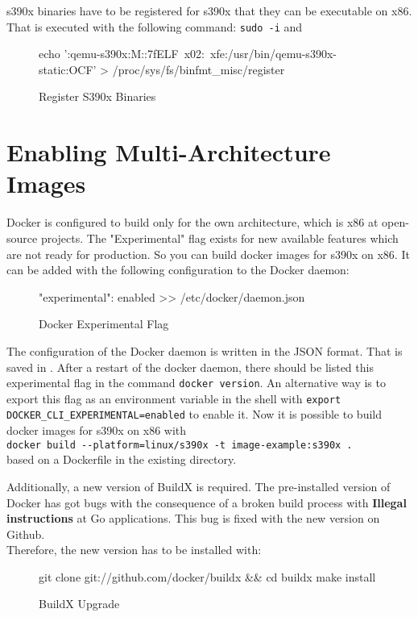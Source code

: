 s390x binaries have to be registered for s390x that they can be executable on x86. That is executed with the following command: \lstinline!sudo -i! and 
\begin{figure}[H]
\centering
\begin{boxedverbatim}
echo ':qemu-s390x:M::\x7fELF\
x02:\xff\xff\xff\xff\xff\xff\xff{}\xff\xff\xff\xff\xff\xff\xff\xff\xff\
xfe\xff\xff:/usr/bin/qemu-s390x-static:OCF' > /proc/sys/fs/binfmt_misc/register
\end{boxedverbatim}
 \caption{Register S390x Binaries}
    \label{RegisterS390xBinaries}
\end{figure}

\section{Enabling Multi-Architecture Images}\label{Multi-Architecture-Images}

Docker is configured to build only for the own architecture, which is x86 at open-source projects. The "Experimental" flag exists for new available features which are not ready for production. So you can build docker images for s390x on x86. It can be added with the following configuration to the Docker daemon:
\begin{figure}[H]
\centering
\begin{boxedverbatim}
{
  "experimental": enabled
} >> /etc/docker/daemon.json
\end{boxedverbatim}
 \caption{Docker Experimental Flag}
    \label{DockerExperimentalFlag}
\end{figure}
The configuration of the Docker daemon is written in the JSON format. That is saved in .
After a restart of the docker daemon, there should be listed this experimental flag in the command  \lstinline!docker version!. An alternative way is to export this flag as an environment variable in the shell with  \lstinline!export DOCKER_CLI_EXPERIMENTAL=enabled! to enable it. Now it is possible to build docker images for s390x on x86 with \\ \lstinline!docker build --platform=linux/s390x -t image-example:s390x .! \\
based on a Dockerfile in the existing directory.

 
Additionally, a new version of BuildX is required. The pre-installed version of Docker has got bugs with the consequence of a broken build process with \textbf{Illegal instructions} at Go applications. This bug is fixed with the new version on Github. \\
Therefore, the new version has to be installed with:
\begin{figure}[H]
\centering
\begin{boxedverbatim}
git clone git://github.com/docker/buildx && cd buildx
make install
\end{boxedverbatim}
 \caption{BuildX Upgrade}
    \label{BuildXUpgrade}
\end{figure}
 

